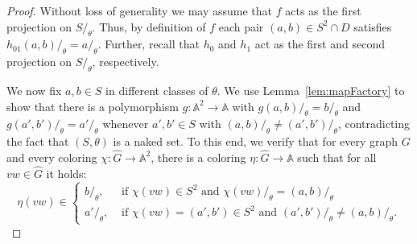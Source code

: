 \documentclass[oneside]{amsart}
\newcommand{\str}[1]{\mathbb{#1}}
\begin{document}
\begin{proof}
  
Without loss of generality we may assume that $f$ acts as the first projection on $S/_\theta$. Thus, by definition of $f$ each pair $(a,b) \in S^2 \cap D$ satisfies $h_{01}(a,b)/_\theta = a/_\theta$.
Further, recall that $h_0$ and $h_1$ act as the first and second projection on $S/_\theta$, respectively.
 
We now fix $a,b\in S$ in different classes of $\theta$.
We use Lemma~\ref{lem:mapFactory} to show that there is a polymorphism $g: \str A^2 \rightarrow \str A$ with $g(a,b)/_\theta = b/_\theta$ and $g(a',b')/_\theta = a'/_\theta$ whenever $a',b'\in S$ with $(a,b)/_\theta\not= (a',b')/_\theta$, contradicting the fact that $(S,\theta)$ is a naked set.
To this end, we verify that for every graph $G$ and every coloring $\chi\colon \hat G\to \str A^2$, there is a coloring $\eta\colon \hat G\to \str A$ such that for all $vw \in \hat G$ it holds:
\begin{equation*}
    \eta(vw) \in 
\begin{cases}
    b/_\theta, &\text{ if } \chi(v w) \in S^2 \text{ and } \chi(v w)/_\theta = (a,b)/_\theta \\
    a'/_\theta, &\text{ if } \chi(vw) = (a',b') \in S^2\text{ and } (a',b')/_\theta \not= (a,b)/_\theta.
\end{cases}
\end{equation*}


\end{proof}
\end{document}
